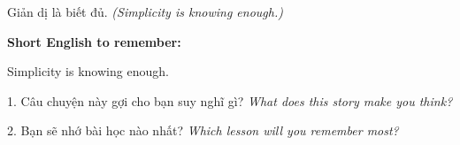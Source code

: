 \begin{baihoc}
Giản dị là biết đủ.
\textit{(Simplicity is knowing enough.)}
\end{baihoc}

\begin{ghinhoanh}
\textbf{Short English to remember:}

Simplicity is knowing enough.

\end{ghinhoanh}

\begin{tuhocnhanh}
1. Câu chuyện này gợi cho bạn suy nghĩ gì? \textit{What does this story make you think?}

2. Bạn sẽ nhớ bài học nào nhất? \textit{Which lesson will you remember most?}
\end{tuhocnhanh}
\ngancach
